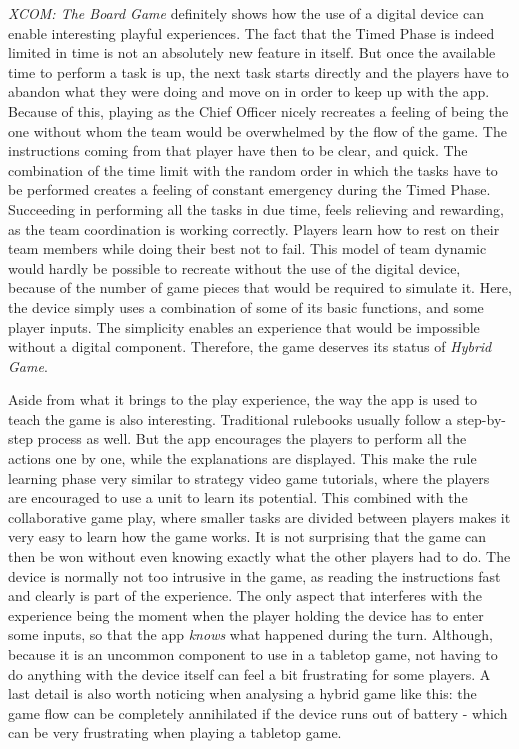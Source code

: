 \textit{XCOM: The Board Game} definitely shows how the use of a digital device can enable interesting playful experiences. The fact that the Timed Phase is indeed limited in time is not an absolutely new feature in itself. But once the available time to perform a task is up, the next task starts directly and the players have to abandon what they were doing and move on in order to keep up with the app. Because of this, playing as the Chief Officer nicely recreates a feeling of being the one without whom the team would be overwhelmed by the flow of the game. The instructions coming from that player have then to be clear, and quick. The combination of the time limit with the random order in which the tasks have to be performed creates a feeling of constant emergency during the Timed Phase. Succeeding in performing all the tasks in due time, feels relieving and rewarding, as the team coordination is working correctly. Players learn how to rest on their team members while doing their best not to fail. This model of team dynamic would hardly be possible to recreate without the use of the digital device, because of the number of game pieces that would be required to simulate it. Here, the device simply uses a combination of some of its basic functions, and some player inputs. The simplicity enables an experience that would be impossible without a digital component. Therefore, the game deserves its status of \textit{Hybrid Game}.

Aside from what it brings to the play experience, the way the app is used to teach the game is also interesting. Traditional rulebooks usually follow a step-by-step process as well. But the app encourages the players to perform all the actions one by one, while the explanations are displayed. This make the rule learning phase very similar to strategy video game tutorials, where the players are encouraged to use a unit to learn its potential. This combined with the collaborative game play, where smaller tasks are divided between players makes it very easy to learn how the game works. It is not surprising that the game can then be won without even knowing exactly what the other players had to do.
The device is normally not too intrusive in the game, as reading the instructions fast and clearly is part of the experience. The only aspect that interferes with the experience being the moment when the player holding the device has to enter some inputs, so that the app \textit{knows} what happened during the turn. Although, because it is an uncommon component to use in a tabletop game, not having to do anything with the device itself can feel a bit frustrating for some players. A last detail is also worth noticing when analysing a hybrid game like this: the game flow can be completely annihilated if the device runs out of battery - which can be very frustrating when playing a tabletop game. 
